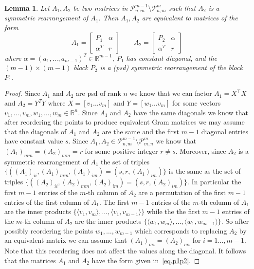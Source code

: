 \documentclass{article}
\newtheorem{Lemma}{Lemma}
\theoremstyle{definition}
\renewcommand{\r}{\mathbb{R}}
\renewcommand{\|}{|}
\begin{document}
\begin{Lemma}\label{lem:XTXYTY}
    Let $A_1, A_2$ be two matrices in $\mathcal{P}^{m-1}_{n,m} \setminus \mathcal{P}^{m}_{n,m}$ such that $A_2$ is a symmetric rearrangement of
    $A_1$. Then $A_1, A_2$ are equivalent to matrices of the form
    \begin{equation} \label{eq.p1p2} A_1 = \begin{bmatrix}
        P_1 & \alpha \\
        \alpha^T & r
    \end{bmatrix} \qquad A_2 = \begin{bmatrix}
        P_2 & \alpha \\
        \alpha^T & r
    \end{bmatrix}
    \end{equation}
    where 
    $\alpha= (a_1,\ldots , a_{m-1})^T \in \r^{m-1}$, $P_1$ has constant diagonal, and the $(m-1) \times (m-1)$ block $P_2$ is a (psd) symmetric rearrangement of the block $P_1$.
\end{Lemma}
\begin{proof}
Since $A_1$ and $A_2$ are psd of rank $n$ we know that we can factor
$A_1 = X^\top X$ and $A_2 = Y^TY$ where $X = [v_1 \ldots v_m]$ and $Y = [w_1 \ldots v_m]$
for some vectors $v_1, \ldots , v_m, w_1, \ldots , w_m \in \r^n$. Since $A_1$ and $A_2$ have the same diagonals we know that after reordering the points to produce equivalent Gram matrices
we may assume that the diagonals of $A_1$ and $A_2$ are the same and the first $m-1$ diagonal entries
have constant value $s$. Since $A_1, A_2 \in \mathcal{P}^{m-1}_{n,m} \setminus \mathcal{P}^{m}_{m,n}$
we know that $(A_1)_{mm} = (A_2)_{mm}=r$ for some positive integer $r\neq s$. Moreover, 
since $A_2$ is a symmetric rearrangement of $A_1$ the set of triples $\{((A_1)_{ii}, (A_1)_{mm},(A_1)_{im}) =(s,r,(A_1)_{im})\}$
is the same as the set of triples $\{((A_2)_{ii}, (A_2)_{mm}, (A_2)_{im})= (s,r,(A_2)_{im})\}$. In particular
the first $m-1$ entries of the $m$-th column of $A_2$ are a permutation of the first
$m-1$ entries of the first column of $A_1$. The first $m-1$ entries of the $m$-th column of $A_1$ are the inner products
$\{\langle v_1, v_m \rangle, \ldots , \langle v_1, v_{m-1} \rangle \}$ while the the first $m-1$ entries
of the $m$-th column of $A_2$ are the inner products $\{\langle w_1, w_m \rangle, \ldots , \langle w_1, w_{m-1} \rangle\}$. So
after possibly reordering the points $w_1,\ldots , w_{m-1}$ which corresponds to replacing $A_2$ by an equivalent matrix we can assume that $(A_1)_{mi} = (A_2)_{mi}$ for $i =1 \ldots , m-1$. Note that this reordering does not affect the values along the diagonal. It follows that the matrices $A_1$ and $A_2$ have the form given in~\eqref{eq.p1p2}.
\end{proof}
\end{document}
